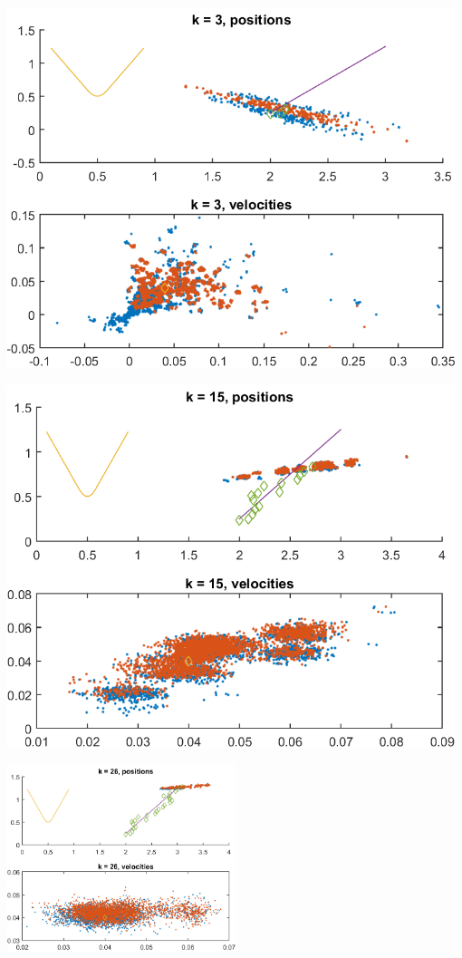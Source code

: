 \documentclass[english,DIV=13]{scrreprt}
\begin{document}
  \begin{center}
	\begin{minipage}{.5\textwidth}
   		\includegraphics[width=0.98\textwidth]{img/q4_3.png}
	\end{minipage}%
	\begin{minipage}{.5\textwidth}
		 \includegraphics[width=0.98\textwidth]{img/q4_15.png}
	\end{minipage}
\end{center}
  \begin{center}
		 \includegraphics[width=0.5\textwidth]{img/q4_26.png}
\end{center}
  
\end{document}
